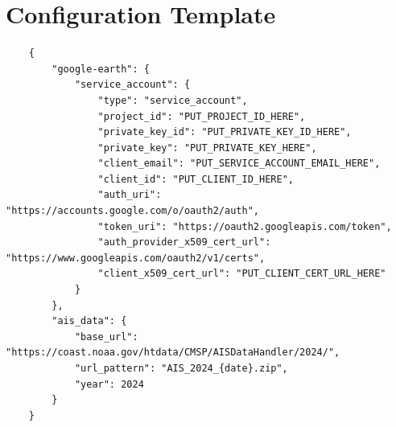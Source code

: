 \documentclass{article}
\begin{document}
\newpage

\section{Configuration Template}  \label{appendix:conf}

\begin{verbatim}
	{
		"google-earth": {
			"service_account": {
				"type": "service_account",
				"project_id": "PUT_PROJECT_ID_HERE",
				"private_key_id": "PUT_PRIVATE_KEY_ID_HERE",
				"private_key": "PUT_PRIVATE_KEY_HERE",
				"client_email": "PUT_SERVICE_ACCOUNT_EMAIL_HERE",
				"client_id": "PUT_CLIENT_ID_HERE",
				"auth_uri": "https://accounts.google.com/o/oauth2/auth",
				"token_uri": "https://oauth2.googleapis.com/token",
				"auth_provider_x509_cert_url": "https://www.googleapis.com/oauth2/v1/certs",
				"client_x509_cert_url": "PUT_CLIENT_CERT_URL_HERE"
			}
		},
		"ais_data": {
			"base_url": "https://coast.noaa.gov/htdata/CMSP/AISDataHandler/2024/",
			"url_pattern": "AIS_2024_{date}.zip",
			"year": 2024
		}
	}
\end{verbatim}
\end{document}
